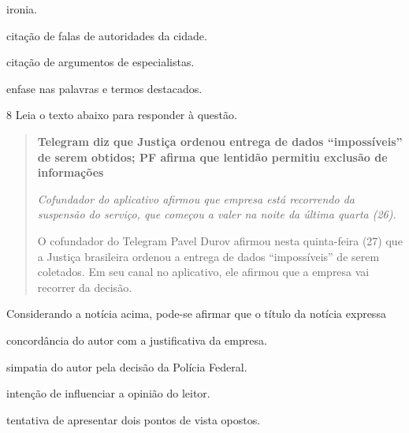 \begin{escolha}
    
    \item ironia. 
    
    \item citação de falas de autoridades da cidade.
    
    \item citação de argumentos de especialistas.
    
    \item enfase nas palavras e termos destacados.

\end{escolha}

\num{8} Leia o texto abaixo para responder à questão. 

\begin{quote}

\textbf{Telegram diz que Justiça ordenou entrega de dados ``impossíveis''
de serem obtidos; PF afirma que lentidão permitiu exclusão de
informações}

\textit{Cofundador do aplicativo afirmou que empresa está recorrendo da
suspensão do serviço, que começou a valer na noite da última quarta
(26).}

O cofundador do Telegram Pavel Durov afirmou nesta quinta-feira (27) que
a Justiça brasileira ordenou a entrega de dados ``impossíveis'' de serem
coletados. Em seu canal no aplicativo, ele afirmou que a empresa vai
recorrer da decisão.

\end{quote}


Considerando a notícia acima, pode-se afirmar que o título da notícia expressa

\begin{escolha}

    \item concordância do autor com a justificativa da empresa. 

    \item simpatia do autor pela decisão da Polícia Federal.  

    \item intenção de influenciar a opinião do leitor.  

    \item tentativa de apresentar dois pontos de vista opostos. 

\end{escolha}

